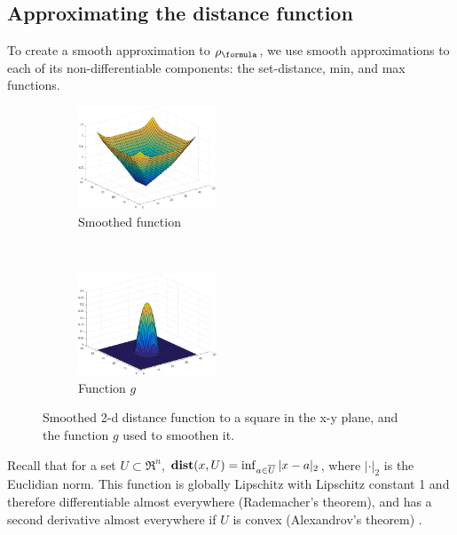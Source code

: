 \subsection{Approximating the distance function}
\label{sec:dist smoothing}
To create a smooth approximation to $\robf$, we use smooth approximations to each of its non-differentiable components: the set-distance, min, and max functions.

\begin{figure}[t!]
	\centering
	\begin{subfigure}[t]{0.25\textwidth}
		\includegraphics[height=1.2in]{figures/smoothedSignedDist}
		\caption{Smoothed function}
	\end{subfigure}%
	~
	\begin{subfigure}[t]{0.25\textwidth}
		\includegraphics[height=1.2in]{figures/kernelG}
		\caption{Function $g$}
	\end{subfigure}
	\caption{{\small Smoothed 2-d distance function to a square in the x-y plane, and the function $g$ used to smoothen it.}}
	\vspace{-10pt}
	\label{fig:smooth2d}
\end{figure}

Recall that for a set $U \subset \Re^n$, $\mathbf{dist}(x,U) = \inf_{a \in \overline{U}} |x-a|_2$, where $|\cdot|_2$ is the Euclidian norm.
This function is globally Lipschitz with Lipschitz constant 1 and therefore differentiable almost everywhere (Rademacher's theorem), and has a second derivative almost everywhere if $U$ is convex (Alexandrov's theorem) \cite{MakelaN92book}.

